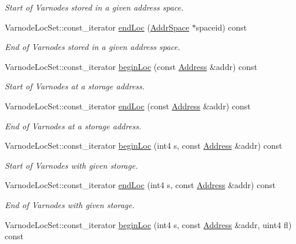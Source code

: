 \begin{DoxyCompactItemize}
\begin{DoxyCompactList}\small\item\em Start of Varnodes stored in a given address space. \end{DoxyCompactList}\item 
Varnode\+Loc\+Set\+::const\+\_\+iterator \mbox{\hyperlink{class_funcdata_a23bcf948b0b6306696e595b2464c746b}{end\+Loc}} (\mbox{\hyperlink{class_addr_space}{Addr\+Space}} $\ast$spaceid) const
\begin{DoxyCompactList}\small\item\em End of Varnodes stored in a given address space. \end{DoxyCompactList}\item 
Varnode\+Loc\+Set\+::const\+\_\+iterator \mbox{\hyperlink{class_funcdata_a04bcc9eaf90591b9200db7cfd1c2fce5}{begin\+Loc}} (const \mbox{\hyperlink{class_address}{Address}} \&addr) const
\begin{DoxyCompactList}\small\item\em Start of Varnodes at a storage address. \end{DoxyCompactList}\item 
Varnode\+Loc\+Set\+::const\+\_\+iterator \mbox{\hyperlink{class_funcdata_a4417d6ddefad162550e3abdbe8424d76}{end\+Loc}} (const \mbox{\hyperlink{class_address}{Address}} \&addr) const
\begin{DoxyCompactList}\small\item\em End of Varnodes at a storage address. \end{DoxyCompactList}\item 
Varnode\+Loc\+Set\+::const\+\_\+iterator \mbox{\hyperlink{class_funcdata_ad2b7ea0975c8f7022f14158d3bb9e9d5}{begin\+Loc}} (int4 s, const \mbox{\hyperlink{class_address}{Address}} \&addr) const
\begin{DoxyCompactList}\small\item\em Start of Varnodes with given storage. \end{DoxyCompactList}\item 
Varnode\+Loc\+Set\+::const\+\_\+iterator \mbox{\hyperlink{class_funcdata_ac026cfb35c8a407c50d21837510d78f7}{end\+Loc}} (int4 s, const \mbox{\hyperlink{class_address}{Address}} \&addr) const
\begin{DoxyCompactList}\small\item\em End of Varnodes with given storage. \end{DoxyCompactList}\item 
Varnode\+Loc\+Set\+::const\+\_\+iterator \mbox{\hyperlink{class_funcdata_afc1213896328c86680dc05c9c5daa7c5}{begin\+Loc}} (int4 s, const \mbox{\hyperlink{class_address}{Address}} \&addr, uint4 fl) const

\end{DoxyCompactItemize}
